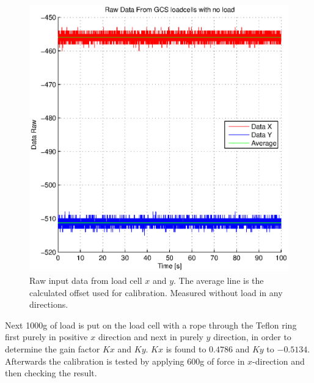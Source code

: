 \begin{figure}[hbtp]
\centering
\includegraphics[scale=1]{graphics/gcs_test/calib_0_data_raw.eps}
\caption[Raw data from load cell]{Raw input data from load cell $x$ and $y$. The average line is the calculated offset used for calibration. Measured without load in any directions.}
\end{figure}

Next 1000g of load is put on the load cell with a rope through the Teflon ring first purely in positive $x$ direction and next in purely $y$ direction, in order to determine the gain factor $Kx$ and $Ky$. $Kx$ is found to $0.4786$ and $Ky$ to $-0.5134$. Afterwards the calibration is tested by applying $600$g of force in $x$-direction and then checking the result.

